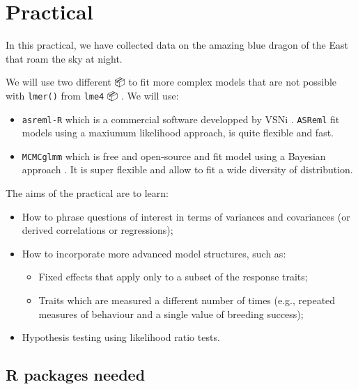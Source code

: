 \documentclass[
  12pt,
]{book}
\providecommand{\tightlist}{%
  \setlength{\itemsep}{0pt}\setlength{\parskip}{0pt}}
\begin{document}
\hypertarget{practical-5}{%
\section{Practical}\label{practical-5}}

In this practical, we have collected data on the amazing blue dragon of the East that roam the sky at night.

We will use two different 📦 to fit more complex models that are not possible with \texttt{lmer()} from \texttt{lme4}
📦 \citep{R-lme4}. We will use:

\begin{itemize}
\tightlist
\item
  \texttt{asreml-R} which is a commercial software developped by VSNi \citep{R-asreml}. \texttt{ASReml} fit models using a maxiumum likelihood approach, is quite flexible and fast.
\item
  \texttt{MCMCglmm} which is free and open-source and fit model using a Bayesian approach \citep{MCMCglmm2010}. It is super flexible and allow to fit a wide diversity of distribution.
\end{itemize}

The aims of the practical are to learn:

\begin{itemize}
\tightlist
\item
  How to phrase questions of interest in terms of variances and covariances (or derived correlations or regressions);
\item
  How to incorporate more advanced model structures, such as:

  \begin{itemize}
  \tightlist
  \item
    Fixed effects that apply only to a subset of the response traits;
  \item
    Traits which are measured a different number of times (e.g., repeated measures of behaviour and a single value of breeding success);
  \end{itemize}
\item
  Hypothesis testing using likelihood ratio tests.
\end{itemize}

\hypertarget{r-packages-needed-2}{%
\subsection{R packages needed}\label{r-packages-needed-2}}
\end{document}
